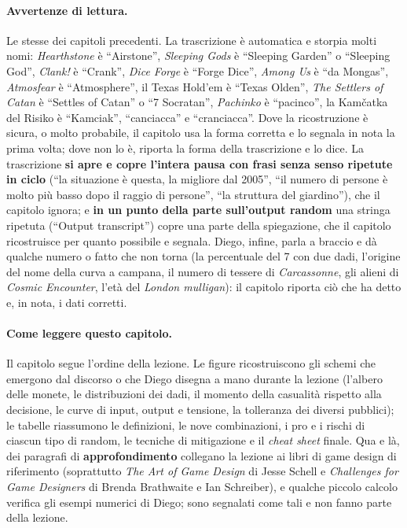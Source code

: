 \paragraph{Avvertenze di lettura.} Le stesse dei capitoli precedenti. La trascrizione è
automatica e storpia molti nomi: \emph{Hearthstone} è ``Airstone'', \emph{Sleeping Gods}
è ``Sleeping Garden'' o ``Sleeping God'', \emph{Clank!} è ``Crank'', \emph{Dice Forge} è
``Forge Dice'', \emph{Among Us} è ``da Mongas'', \emph{Atmosfear} è ``Atmosphere'', il
Texas Hold'em è ``Texas Olden'', \emph{The Settlers of Catan} è ``Settles of Catan'' o ``7
Socratan'', \emph{Pachinko} è ``pacinco'', la Kamčatka del Risiko è ``Kamciak'',
``canciacca'' e ``cranciacca''. Dove la ricostruzione è sicura, o molto probabile, il
capitolo usa la forma corretta e lo segnala in nota la prima volta; dove non lo è,
riporta la forma della trascrizione e lo dice. La trascrizione \textbf{si apre e copre
l'intera pausa con frasi senza senso ripetute in ciclo} (``la situazione è questa, la
migliore dal 2005'', ``il numero di persone è molto più basso dopo il raggio di persone'',
``la struttura del giardino''), che il capitolo ignora; e \textbf{in un punto della parte
sull'output random} una stringa ripetuta (``Output transcript'') copre una parte della
spiegazione, che il capitolo ricostruisce per quanto possibile e segnala. Diego, infine,
parla a braccio e dà qualche numero o fatto che non torna (la percentuale del 7 con due
dadi, l'origine del nome della curva a campana, il numero di tessere di
\emph{Carcassonne}, gli alieni di \emph{Cosmic Encounter}, l'età del \emph{London
mulligan}): il capitolo riporta ciò che ha detto e, in nota, i dati corretti.

\paragraph{Come leggere questo capitolo.} Il capitolo segue l'ordine della lezione. Le
figure ricostruiscono gli schemi che emergono dal discorso o che Diego disegna a mano
durante la lezione (l'albero delle monete, le distribuzioni dei dadi, il momento della
casualità rispetto alla decisione, le curve di input, output e tensione, la tolleranza dei
diversi pubblici); le tabelle riassumono le definizioni, le nove combinazioni, i pro e i
rischi di ciascun tipo di random, le tecniche di mitigazione e il \emph{cheat sheet}
finale. Qua e là, dei paragrafi di \textbf{approfondimento} collegano la lezione ai libri
di game design di riferimento (soprattutto \emph{The Art of Game Design} di Jesse Schell e
\emph{Challenges for Game Designers} di Brenda Brathwaite e Ian Schreiber), e qualche
piccolo calcolo verifica gli esempi numerici di Diego; sono segnalati come tali e non
fanno parte della lezione.

